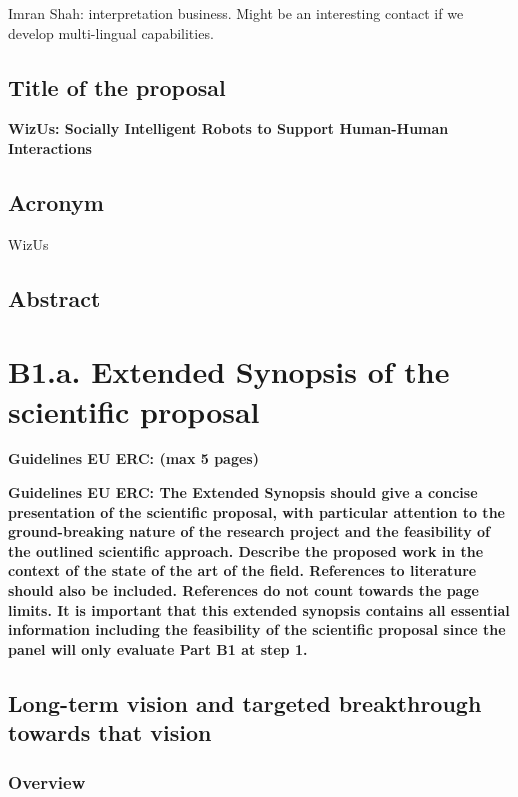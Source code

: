 \documentclass[]{article}
\newcommand{\project}{WizUs\xspace}
\newcommand{\eu}[1]{{\color{teal}\textbf{Guidelines EU ERC: #1}}}
\begin{document}
Imran Shah: interpretation business. Might be an interesting contact if we
develop multi-lingual capabilities.

\subsection*{Title of the proposal}\label{title-of-the-proposal}

\textbf{WizUs: Socially Intelligent Robots to Support Human-Human Interactions}

\subsection*{Acronym}\label{acronym}

\project

\subsection*{Abstract}\label{abstract}

\pagebreak

\section{B1.a. Extended Synopsis of the scientific proposal}\label{part1}
\eu{(max 5 pages)}

\eu{The Extended Synopsis should give a concise presentation of the scientific
proposal, with particular attention to the ground-breaking nature of the
research project and the feasibility of the outlined scientific approach.
Describe the proposed work in the context of the state of the art of the field.
References to literature should also be included. References do not count
towards the page limits. It is important that this extended synopsis contains
all essential information including the feasibility of the scientific proposal
since the panel will only evaluate Part B1 at step 1.}

\subsection{Long-term vision and targeted breakthrough towards that vision}

\subsubsection{Overview}
\end{document}
